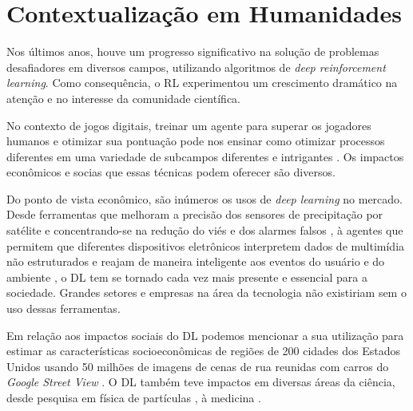 \chapter{Contextualização em Humanidades}
\label{chap:ctx-hum}


Nos últimos anos, houve um progresso significativo na solução de problemas desafiadores em diversos campos, utilizando algoritmos de \textit{deep reinforcement learning}. Como consequência, o RL experimentou um crescimento dramático na atenção e no interesse da comunidade científica. 


No contexto de jogos digitais, treinar um agente para superar os jogadores humanos e otimizar sua pontuação pode nos ensinar como otimizar processos diferentes em uma variedade de subcampos diferentes e intrigantes \cite{comi:teach:AI:DRL:2018}. Os impactos econômicos e socias que essas técnicas podem oferecer são diversos.

Do ponto de vista econômico, são inúmeros os usos de \textit{deep learning} no mercado. Desde ferramentas que melhoram a precisão dos sensores de precipitação por satélite e concentrando-se na redução do viés e dos alarmes falsos \cite{doi:10.1175/JHM-D-15-0075.1}, à agentes que permitem que diferentes dispositivos eletrônicos interpretem dados de multimídia não estruturados e reajam de maneira inteligente aos eventos do usuário e do ambiente \cite{dl-IoT}, o DL tem se tornado cada vez mais presente e essencial para a sociedade. Grandes setores e empresas na área da tecnologia não existiriam sem o uso dessas ferramentas.

Em relação aos impactos sociais do DL podemos mencionar a sua utilização para estimar as características socioeconômicas de regiões de 200 cidades dos Estados Unidos usando 50 milhões de imagens de cenas de rua reunidas com carros do \textit{Google Street View} \cite{Gebru13108}. O DL também teve impactos em diversas áreas da ciência, desde pesquisa em física de partículas \cite{baldi:s:w:2015}, à medicina \cite{nassif:speech-rec:2019}.

